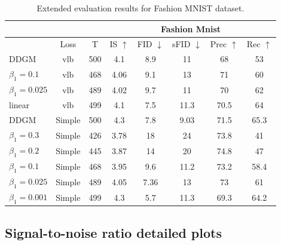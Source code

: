 \begin{table}[ht]
  \centering
  \caption{Extended evaluation results for Fashion MNIST dataset.
}
  \label{tab:extended_results_mnist}
  \begin{tabular}{l||c|c|ccccc}
    \toprule
     & & & \multicolumn{5}{c}{Fashion Mnist}  \\
    \midrule
     &Loss& T &IS  $\uparrow$&FID $\downarrow$& sFID $\downarrow$&Prec $\uparrow$&Rec $\uparrow$\\

    \midrule
    DDGM &vlb& 500 &4.1& 8.9 &11&68 & 53 \\
    \ours{} $\beta_1=0.1$ &vlb& 468 & 4.06& 9.1 &13&71 & 60 \\
    \ours{} $\beta_1=0.025$ &vlb& 489  & 4.02&9.7&11&70&62\\
    \ours{} linear &vlb & 499 & 4.1 &7.5 & 11.3 &70.5 & 64 \\
    \midrule
    DDGM &Simple & 500 &4.3  & 7.8 & 9.03 &71.5 & 65.3\\
    \ours{} $\beta_1=0.3$ &Simple& 426 & 3.78& 18 &24 & 73.8 & 41\\
    \ours{} $\beta_1=0.2$ &Simple& 445 & 3.87& 14 &20 & 74.8 & 47\\
    \ours{} $\beta_1=0.1$ &Simple& 468 &3.95& 9.6 &11.2& 73.2 & 58.4\\
    \ours{} $\beta_1=0.025$ &Simple& 489 & 4.05& 7.36&13 & 73 & 61\\
    \ours{} $\beta_1=0.001$&Simple & 499 &4.3& 5.7 &11.3 & 69.3 & 64.2\\

    \bottomrule
  \end{tabular}
\vspace*{2\baselineskip}
\end{table}

\newpage
\subsection{Signal-to-noise ratio detailed plots}\label{appx:full_snr}

